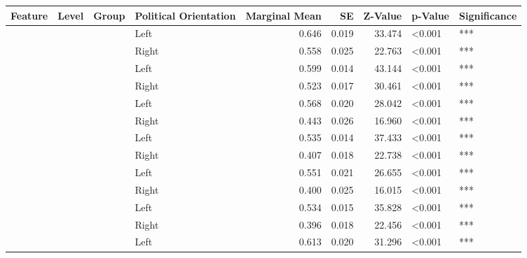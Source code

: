 
\begin{longtable}[t]{>{\raggedright\arraybackslash}t{4cm}>{\raggedright\arraybackslash}t{4cm}>{\raggedright\arraybackslash}t{2.5cm}lrrrll}
\toprule
Feature & Level & Group & Political Orientation & Marginal Mean & SE & Z-Value & p-Value & Significance\\
\midrule
 &  &  & Left & 0.646 & 0.019 & 33.474 & <0.001 & ***\\
\nopagebreak
 &  &  & Right & 0.558 & 0.025 & 22.763 & <0.001 & ***\\
\nopagebreak
 &  &  & Left & 0.599 & 0.014 & 43.144 & <0.001 & ***\\
\nopagebreak
 &  &  & Right & 0.523 & 0.017 & 30.461 & <0.001 & ***\\
\nopagebreak
 &  &  & Left & 0.568 & 0.020 & 28.042 & <0.001 & ***\\
\nopagebreak
 &  &  & Right & 0.443 & 0.026 & 16.960 & <0.001 & ***\\
\nopagebreak
 &  &  & Left & 0.535 & 0.014 & 37.433 & <0.001 & ***\\
\nopagebreak
 &  &  & Right & 0.407 & 0.018 & 22.738 & <0.001 & ***\\
\nopagebreak
 &  &  & Left & 0.551 & 0.021 & 26.655 & <0.001 & ***\\
\nopagebreak
 &  &  & Right & 0.400 & 0.025 & 16.015 & <0.001 & ***\\
\nopagebreak
 &  &  & Left & 0.534 & 0.015 & 35.828 & <0.001 & ***\\
\nopagebreak
{} &  &  & Right & 0.396 & 0.018 & 22.456 & <0.001 & ***\\
\pagebreak[0]
 &  &  & Left & 0.613 & 0.020 & 31.296 & <0.001 & ***\\

\end{longtable}
